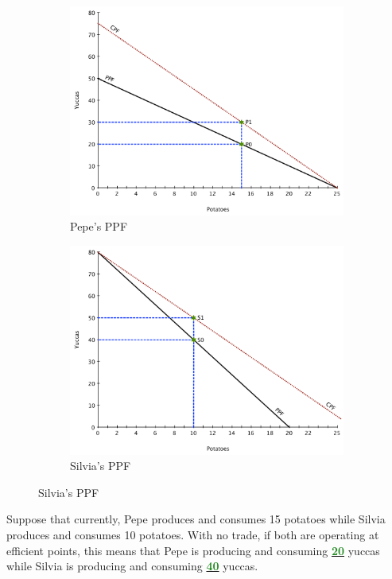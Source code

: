 \documentclass[11pt]{article}\usepackage[]{graphicx}\usepackage[]{color}
\theoremstyle{definition}
\newcommand{\dd}[1]{{\underline{\textbf{\textcolor{ForestGreen}{#1}}}}}
\begin{document}
		\begin{figure}[h!]
			\centering
			\caption{The Gains from Trade}
			\begin{subfigure}{.5\textwidth}
				\includegraphics[scale=.3]{plot5.pdf}
				\caption{Pepe's PPF}
			\end{subfigure}%
			\begin{subfigure}{.5\textwidth}
				\centering
				\includegraphics[scale=.3]{plot6.pdf}
				\caption{Silvia's PPF}
			\end{subfigure}
		\end{figure}
	
	
	Suppose that currently, Pepe produces and consumes 15 potatoes while Silvia produces and consumes 10 potatoes. With no trade, if both are operating at efficient points, this means that Pepe is producing and consuming \dd{20} yuccas while Silvia is producing and consuming \dd{40} yuccas. 
	
\end{document}

